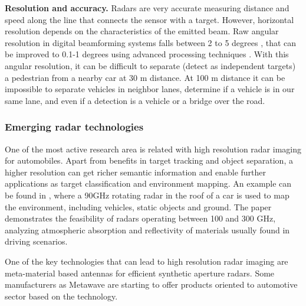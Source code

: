 \documentclass[journal]{IEEEtran}
\begin{document}
\textbf{Resolution and accuracy.} Radars are very accurate measuring 
distance
and speed along the line that connects the sensor with a target. However, 
horizontal resolution depends on the characteristics of the emitted beam.
Raw angular resolution in digital beamforming systems falls between 2 to 5
degrees \cite{Schneider2005}, that can be improved to 0.1-1 degrees using 
advanced 
processing techniques \cite{Kissinger2012}. 
With this angular resolution, it can be difficult to separate (detect as
independent targets) a pedestrian from a nearby car at 30 m distance. 
At 100 m distance it can be impossible to separate vehicles in neighbor
lanes, determine if a vehicle is in our same lane, and even if a detection
is a vehicle or a bridge over the road.

\subsubsection{Emerging radar technologies}

One of the most active research area is related with high resolution radar
imaging for automobiles. Apart from benefits in target tracking and object
separation, a higher resolution can get richer semantic information and enable
further applications as target classification and environment mapping. 
An example can be found in \cite{Reina2015}, where a 90GHz rotating radar in
the roof of a car is used to map the environment, including vehicles, static
objects and ground.
The paper \cite{Kohler2013} demonstrates the feasibility of radars operating
between 100 and 300 GHz, analyzing atmospheric absorption and reflectivity of
materials usually found in driving scenarios.

One of the key technologies that can lead to high resolution radar imaging are 
meta-material based antennas \cite{Brookner2016,Sleasman2017} for efficient
synthetic aperture radars. 
Some manufacturers as Metawave 
are starting to offer products oriented to automotive sector based on the 
technology.
\end{document}

